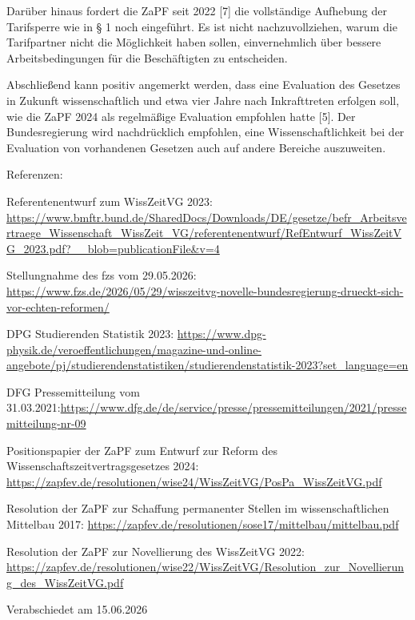 \documentclass[DIV=calc]{scrartcl}
\begin{document}
Darüber hinaus fordert die ZaPF seit 2022 [7] die vollständige Aufhebung der Tarifsperre wie in § 1 noch eingeführt. Es ist nicht nachzuvollziehen, warum die Tarifpartner nicht die Möglichkeit haben sollen, einvernehmlich über bessere Arbeitsbedingungen für die Beschäftigten zu entscheiden.

Abschließend kann positiv angemerkt werden, dass eine Evaluation des Gesetzes in Zukunft wissenschaftlich und etwa vier Jahre nach Inkrafttreten erfolgen soll, wie die ZaPF 2024 als regelmäßige Evaluation empfohlen hatte [5]. Der Bundesregierung wird nachdrücklich empfohlen, eine Wissenschaftlichkeit bei der Evaluation von vorhandenen Gesetzen auch auf andere Bereiche auszuweiten.

\newpage
Referenzen:
\begin{enumerate}[{[}1{]}]
    \item Referentenentwurf zum WissZeitVG 2023: \url{https://www.bmftr.bund.de/SharedDocs/Downloads/DE/gesetze/befr_Arbeitsvertraege_Wissenschaft_WissZeit_VG/referentenentwurf/RefEntwurf_WissZeitVG_2023.pdf?__blob=publicationFile&v=4}
    \item Stellungnahme des fzs vom 29.05.2026: \url{https://www.fzs.de/2026/05/29/wisszeitvg-novelle-bundesregierung-drueckt-sich-vor-echten-reformen/}
    \item DPG Studierenden Statistik 2023: \url{https://www.dpg-physik.de/veroeffentlichungen/magazine-und-online-angebote/pj/studierendenstatistiken/studierendenstatistik-2023?set_language=en}
    \item DFG Pressemitteilung vom 31.03.2021:\url{https://www.dfg.de/de/service/presse/pressemitteilungen/2021/pressemitteilung-nr-09}
    \item Positionspapier der ZaPF zum Entwurf zur Reform des Wissenschaftszeitvertragsgesetzes 2024: \url{https://zapfev.de/resolutionen/wise24/WissZeitVG/PosPa_WissZeitVG.pdf}
    \item Resolution der ZaPF zur Schaffung permanenter Stellen im wissenschaftlichen Mittelbau 2017: \url{https://zapfev.de/resolutionen/sose17/mittelbau/mittelbau.pdf}
    \item Resolution der ZaPF zur Novellierung des WissZeitVG 2022: \url{https://zapfev.de/resolutionen/wise22/WissZeitVG/Resolution_zur_Novellierung_des_WissZeitVG.pdf}
\end{enumerate}
    


\vspace{1cm} 
%
\vfill
\begin{flushright}
	Verabschiedet am 15.06.2026 \\
\end{flushright}
\end{document}

